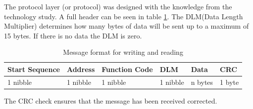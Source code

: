 The protocol layer (or protocol) was designed with the knowledge from the technology study. A full header can be seen in table \ref{table:stdmsgtosensor}. The DLM(Data Length Multiplier) determines how many bytes of data will be sent up to a maximum of 15 bytes. If there is no data the DLM is zero.
\begin{table}[hbpt]
\centering
\begin{tabular}{|l|l|l|l|l|l|}
	\hline
	Start Sequence & Address & Function Code & DLM & Data & CRC  \\ \hline
	1 nibble & 1 nibble	& 1 nibble & 1 nibble & n bytes & 1 byte\\
	\hline
\end{tabular}
\caption{Message format for writing and reading}
\label{table:stdmsgtosensor}
\end{table}
The CRC check ensures that the message has been received corrected.


